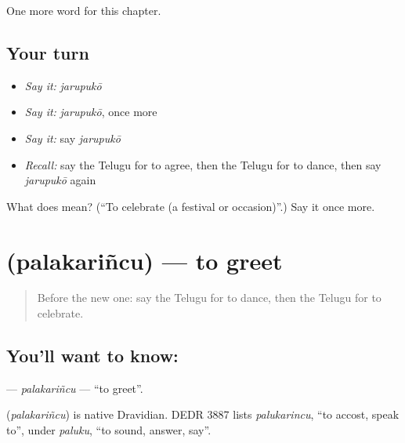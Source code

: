 \begin{grammarlens}[title={What you've built}]
One more word for this chapter.
\end{grammarlens}

\subsection*{Your turn}
\begin{itemize}
\raggedright
  \item \emph{Say it:} \emph{jarupukō}
  \item \emph{Say it:} \emph{jarupukō}, once more
  \item \emph{Say it:} say \emph{jarupukō}
  \item \emph{Recall:} say the Telugu for to agree, then the Telugu for to dance, then say \emph{jarupukō} again
\end{itemize}

\begin{tcolorbox}[breakable,colback=teal!4,colframe=teal!35!black,title={Before you move on}]
What does  mean? (\textquotedblleft{}To celebrate (a festival or occasion)\textquotedblright{}.) Say it once more.
\end{tcolorbox}
\section[\texorpdfstring{\te{పలకరించు} (palakariñcu)}{పలకరించు (palakariñcu)}]{ (palakariñcu) — to greet}

\label{lesson:TE-C161-palakarincu}



\begin{quote}
Before the new one: say the Telugu for to dance, then the Telugu for to celebrate.
\end{quote}

\subsection*{You'll want to know: }
\textbf{} — \emph{palakariñcu} — \textquotedblleft{}to greet\textquotedblright{}.

\begin{cousinweb}
\textbf{} (\emph{palakariñcu}) is native Dravidian. DEDR 3887 lists \emph{palukarincu}, \textquotedblleft{}to accost, speak to\textquotedblright{}, under \emph{paluku}, \textquotedblleft{}to sound, answer, say\textquotedblright{}.
\end{cousinweb}

